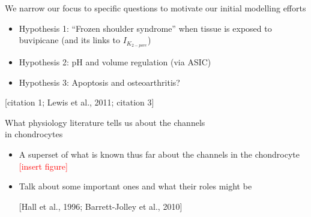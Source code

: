 \documentclass[ignorenonframetext]{beamer}
\newcommand{\references}[1] {
  \begin{flushright}
    \scriptsize [#1] \normalsize
  \end{flushright}
}
\newcommand{\addfigure} {
  \scriptsize
  \textcolor{red}{[insert figure]}
  \normalsize
}
\begin{document}
%

\begin{frame}{We narrow our focus to specific questions to motivate
    our initial modelling efforts}

  \begin{itemize}
  \item Hypothesis 1: ``Frozen shoulder syndrome'' when tissue is
    exposed to buvipicane (and its links to $I_{K_{2-pore}}$)
  \item Hypothesis 2: pH and volume regulation (via ASIC)
  \item Hypothesis 3: Apoptosis and osteoarthritis?
  \end{itemize}

\references{citation 1; Lewis et al., 2011; citation 3}

\end{frame}

%
%
%

\begin{frame}{What physiology literature tells us about the channels\\
    in chondrocytes}

  \begin{itemize}
  \item A superset of what is known thus far about the channels in the
    chondrocyte \addfigure
  \item Talk about some important ones and what their roles might be

    \references{Hall et al., 1996; Barrett-Jolley et al., 2010}

  \end{itemize}

\end{frame}

%
\end{document}
